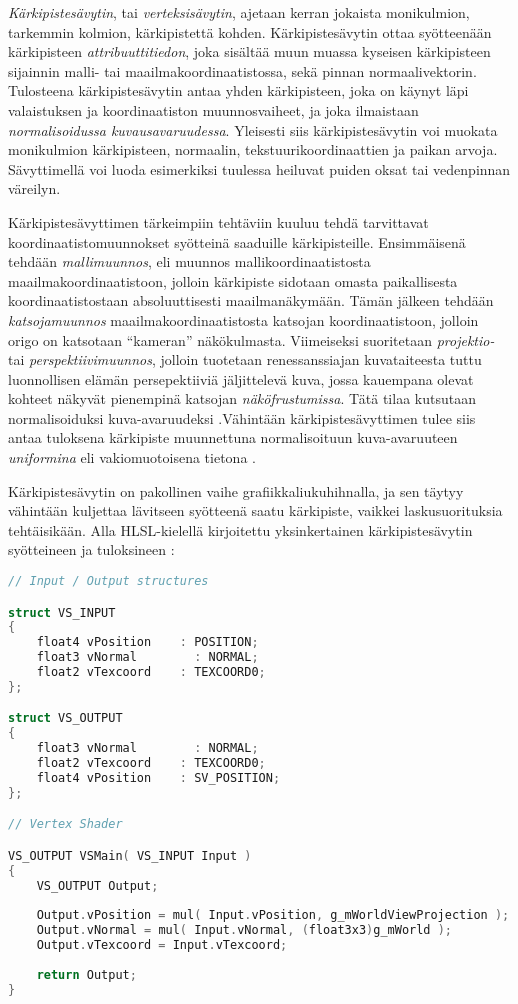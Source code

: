 \documentclass[finnish]{tktltiki2}
\theoremstyle{definition}
\theoremstyle{remark}
\begin{document}
\emph{Kärkipistesävytin}, tai \emph{verteksisävytin}, ajetaan kerran jokaista monikulmion, tarkemmin kolmion, kärkipistettä kohden. Kärkipistesävytin ottaa syötteenään kärkipisteen \emph{attribuuttitiedon}, joka sisältää muun muassa kyseisen kärkipisteen sijainnin malli- tai maailmakoordinaatistossa, sekä pinnan normaalivektorin. Tulosteena kärkipistesävytin antaa yhden kärkipisteen, joka on käynyt läpi valaistuksen ja koordinaatiston muunnosvaiheet, ja joka ilmaistaan \emph{normalisoidussa kuvausavaruudessa}. Yleisesti siis kärkipistesävytin voi muokata monikulmion kärkipisteen, normaalin, tekstuurikoordinaattien ja paikan arvoja. Sävyttimellä voi luoda esimerkiksi tuulessa heiluvat puiden oksat tai vedenpinnan väreilyn.

Kärkipistesävyttimen tärkeimpiin tehtäviin kuuluu tehdä tarvittavat koordinaatistomuunnokset syötteinä saaduille kärkipisteille. Ensimmäisenä tehdään \emph{mallimuunnos}, eli muunnos mallikoordinaatistosta maailmakoordinaatistoon, jolloin kärkipiste sidotaan omasta paikallisesta koordinaatistostaan absoluuttisesti maailmanäkymään. Tämän jälkeen tehdään \emph{katsojamuunnos} maailmakoordinaatistosta katsojan koordinaatistoon, jolloin origo on katsotaan ``kameran'' näkökulmasta. Viimeiseksi suoritetaan \emph{projektio-} tai \emph{perspektiivimuunnos}, jolloin tuotetaan renessanssiajan kuvataiteesta tuttu luonnollisen elämän persepektiiviä jäljittelevä kuva, jossa kauempana olevat kohteet näkyvät pienempinä katsojan \emph{näköfrustumissa}. Tätä tilaa kutsutaan normalisoiduksi kuva-avaruudeksi \cite{Puh08}.Vähintään kärkipistesävyttimen tulee siis antaa tuloksena kärkipiste muunnettuna normalisoituun kuva-avaruuteen \emph{uniformina} eli vakiomuotoisena tietona \cite{Puh08}.

Kärkipistesävytin on pakollinen vaihe grafiikkaliukuhihnalla, ja sen täytyy vähintään kuljettaa lävitseen syötteenä saatu kärkipiste, vaikkei laskusuorituksia tehtäisikään. Alla HLSL-kielellä kirjoitettu yksinkertainen kärkipistesävytin syötteineen ja tuloksineen \cite{Mic11}:
\lstset{breaklines=true}
\begin{lstlisting}[language=c, basicstyle=\footnotesize]
// Input / Output structures

struct VS_INPUT
{
    float4 vPosition    : POSITION;
    float3 vNormal        : NORMAL;
    float2 vTexcoord    : TEXCOORD0;
};

struct VS_OUTPUT
{
    float3 vNormal        : NORMAL;
    float2 vTexcoord    : TEXCOORD0;
    float4 vPosition    : SV_POSITION;
};

// Vertex Shader

VS_OUTPUT VSMain( VS_INPUT Input )
{
    VS_OUTPUT Output;
    
    Output.vPosition = mul( Input.vPosition, g_mWorldViewProjection );
    Output.vNormal = mul( Input.vNormal, (float3x3)g_mWorld );
    Output.vTexcoord = Input.vTexcoord;
    
    return Output;
}
\end{lstlisting}
\end{document}
